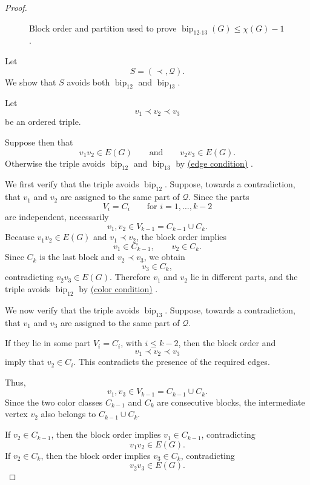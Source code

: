 \documentclass[12pt]{article}
\theoremstyle{plain}
\theoremstyle{definition}
\theoremstyle{remark}
\theoremstyle{definition}
\newcommand{\edgecondition}{%
  \hyperref[def:avoid:cond:edge]{(edge condition)}\xspace
}
\newcommand{\colorcondition}{%
  \hyperref[def:avoid:cond:color]{(color condition)}\xspace
}
\newcommand{\biplabel}{\mathrm{bip}}
\DeclareRobustCommand{\bipparam}[1]{%
  \ensuremath{\mathop{\biplabel}\nolimits_{#1}}%
}
\begin{document}
\begin{proof}
\begin{figure}[h]

\caption{Block order and partition used to prove
\(\bipparam{12\text{-}13}(G)\le\chi(G)-1\).}
\label{fig:bip12-13-horizontal}
\end{figure}



Let
\[
S=(\prec,\mathcal Q).
\]
We show that \(S\) avoids both \(\bipparam{12}\) and \(\bipparam{13}\).

Let
\[
v_1\prec v_2\prec v_3
\]
be an ordered triple.

Suppose then that
\[
v_1v_2\in E(G)
\qquad\text{and}\qquad
v_2v_3\in E(G).
\]
Otherwise the triple avoids \(\bipparam{12}\) and \(\bipparam{13}\) by \edgecondition.

We first verify that the triple avoids \(\bipparam{12}\). Suppose, towards a contradiction, that \(v_1\) and \(v_2\)
are assigned to the same part of \(\mathcal Q\). Since the parts
\[
V_i=C_i
\qquad\text{for }i=1,\dots,k-2
\]
are independent, necessarily
\[
v_1,v_2\in V_{k-1}=C_{k-1}\cup C_k.
\]
Because \(v_1v_2\in E(G)\) and \(v_1\prec v_2\), the block order implies
\[
v_1\in C_{k-1},
\qquad
v_2\in C_k.
\]
Since \(C_k\) is the last block and \(v_2\prec v_3\), we obtain
\[
v_3\in C_k,
\]
contradicting \(v_2v_3\in E(G)\). Therefore \(v_1\) and \(v_2\) lie in different parts, and the triple avoids
\(\bipparam{12}\) by \colorcondition.

We now verify that the triple avoids \(\bipparam{13}\). Suppose, towards a contradiction, that \(v_1\) and \(v_3\)
are assigned to the same part of \(\mathcal Q\).

If they lie in some part \(V_i=C_i\), with \(i\le k-2\), then the block order and
\[
v_1\prec v_2\prec v_3
\]
imply that \(v_2\in C_i\). This contradicts the presence of the required edges.

Thus,
\[
v_1,v_3\in V_{k-1}=C_{k-1}\cup C_k.
\]
Since the two color classes \(C_{k-1}\) and \(C_k\) are consecutive blocks, the intermediate vertex \(v_2\) also
belongs to \(C_{k-1}\cup C_k\).

If \(v_2\in C_{k-1}\), then the block order implies \(v_1\in C_{k-1}\), contradicting
\[
v_1v_2\in E(G).
\]
If \(v_2\in C_k\), then the block order implies \(v_3\in C_k\), contradicting
\[
v_2v_3\in E(G).
\]


\end{proof}
\end{document}
